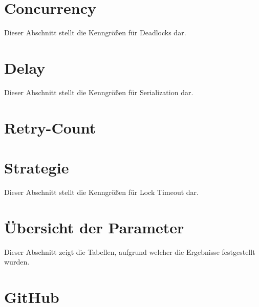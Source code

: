 
\section{Concurrency}
\label{appsec:concurrency}

Dieser Abschnitt stellt die Kenngrößen für Deadlocks dar.



\clearpage

\section{Delay}
\label{appsec:delay}

Dieser Abschnitt stellt die Kenngrößen für Serialization dar.



\clearpage

\section{Retry-Count}
\label{appsec:retryCount}



\clearpage

\section{Strategie}
\label{appsec:strategy}

Dieser Abschnitt stellt die Kenngrößen für Lock Timeout dar.



\clearpage

\section{Übersicht der Parameter}
\label{appsec:8.1}

Dieser Abschnitt zeigt die Tabellen, aufgrund welcher die Ergebnisse festgestellt wurden.



\clearpage

\section{GitHub}
\label{appsec:github}


